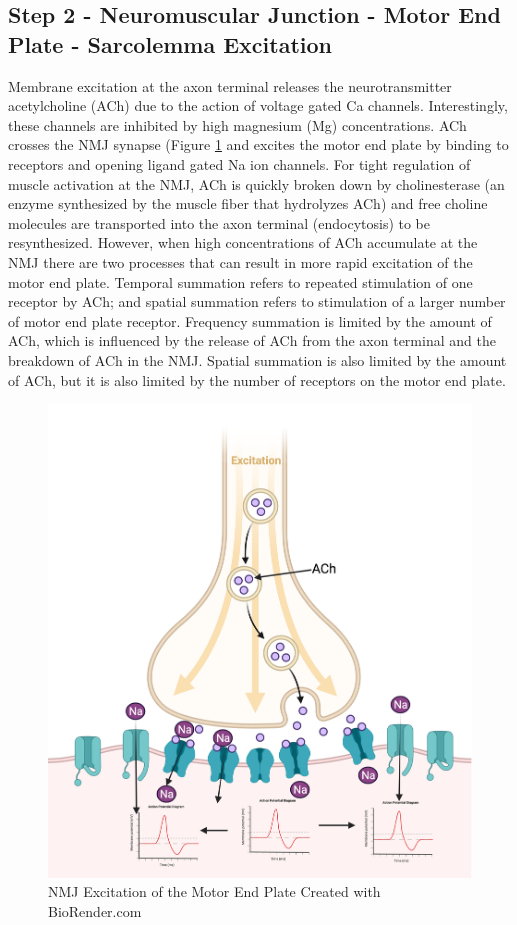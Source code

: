 \subsection{Step 2 - Neuromuscular Junction - Motor End Plate - Sarcolemma Excitation}

Membrane excitation at the axon terminal releases the neurotransmitter acetylcholine (ACh) due to the action of voltage gated Ca channels. Interestingly, these channels are inhibited by high magnesium (Mg) concentrations. ACh crosses the NMJ synapse (Figure \ref{fig:NMJ} and excites the motor end plate by binding to receptors and opening ligand gated Na ion channels. For tight regulation of muscle activation at the NMJ, ACh is quickly broken down by cholinesterase (an enzyme synthesized by the muscle fiber that hydrolyzes ACh) and free choline molecules are transported into the axon terminal (endocytosis) to be resynthesized. However, when high concentrations of ACh accumulate at the NMJ there are two processes that can result in more rapid excitation of the motor end plate. Temporal summation refers to repeated stimulation of one receptor by ACh; and spatial summation refers to stimulation of a larger number of motor end plate receptor. Frequency summation is limited by the amount of ACh, which is influenced by the release of ACh from the axon terminal and the breakdown of ACh in the NMJ. Spatial summation is also limited by the amount of ACh, but it is also limited by the number of receptors on the motor end plate.

\begin{figure}[!ht]
    \centering
    \includegraphics[width=1\linewidth]{./figure/NMJ.png}
    \caption{NMJ Excitation of the Motor End Plate \footnotesize{Created with BioRender.com}}
    \label{fig:NMJ}
\end{figure}


